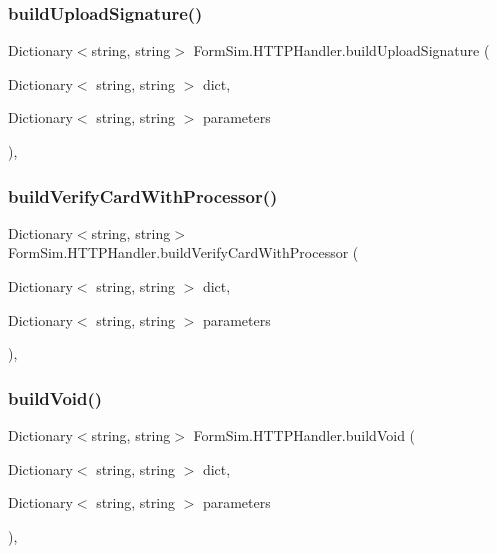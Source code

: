 \subsubsection{\texorpdfstring{build\+Upload\+Signature()}{buildUploadSignature()}}
{\footnotesize\ttfamily Dictionary$<$string, string$>$ Form\+Sim.\+H\+T\+T\+P\+Handler.\+build\+Upload\+Signature (\begin{DoxyParamCaption}\item[{Dictionary$<$ string, string $>$}]{dict,  }\item[{Dictionary$<$ string, string $>$}]{parameters }\end{DoxyParamCaption})\hspace{0.3cm}{\ttfamily [inline]}, {\ttfamily [private]}}

\mbox{\label{class_form_sim_1_1_h_t_t_p_handler_a3123725d76b87880efbaa48e83395e3d}} 
\subsubsection{\texorpdfstring{build\+Verify\+Card\+With\+Processor()}{buildVerifyCardWithProcessor()}}
{\footnotesize\ttfamily Dictionary$<$string, string$>$ Form\+Sim.\+H\+T\+T\+P\+Handler.\+build\+Verify\+Card\+With\+Processor (\begin{DoxyParamCaption}\item[{Dictionary$<$ string, string $>$}]{dict,  }\item[{Dictionary$<$ string, string $>$}]{parameters }\end{DoxyParamCaption})\hspace{0.3cm}{\ttfamily [inline]}, {\ttfamily [private]}}

\mbox{\label{class_form_sim_1_1_h_t_t_p_handler_acf01dc8988fc697ac06f4f031f045451}} 
\subsubsection{\texorpdfstring{build\+Void()}{buildVoid()}}
{\footnotesize\ttfamily Dictionary$<$string, string$>$ Form\+Sim.\+H\+T\+T\+P\+Handler.\+build\+Void (\begin{DoxyParamCaption}\item[{Dictionary$<$ string, string $>$}]{dict,  }\item[{Dictionary$<$ string, string $>$}]{parameters }\end{DoxyParamCaption})\hspace{0.3cm}{\ttfamily [inline]}, {\ttfamily [private]}}

